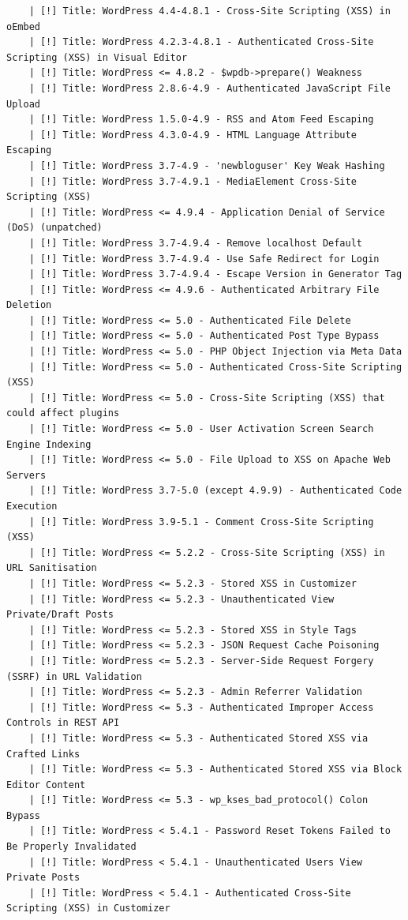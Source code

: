 \documentclass[11pt]{utalcaDoc}
\begin{document}
\begin{verbatim}
	| [!] Title: WordPress 4.4-4.8.1 - Cross-Site Scripting (XSS) in oEmbed
	| [!] Title: WordPress 4.2.3-4.8.1 - Authenticated Cross-Site Scripting (XSS) in Visual Editor
	| [!] Title: WordPress <= 4.8.2 - $wpdb->prepare() Weakness
	| [!] Title: WordPress 2.8.6-4.9 - Authenticated JavaScript File Upload
	| [!] Title: WordPress 1.5.0-4.9 - RSS and Atom Feed Escaping
	| [!] Title: WordPress 4.3.0-4.9 - HTML Language Attribute Escaping
	| [!] Title: WordPress 3.7-4.9 - 'newbloguser' Key Weak Hashing
	| [!] Title: WordPress 3.7-4.9.1 - MediaElement Cross-Site Scripting (XSS)
	| [!] Title: WordPress <= 4.9.4 - Application Denial of Service (DoS) (unpatched)
	| [!] Title: WordPress 3.7-4.9.4 - Remove localhost Default
	| [!] Title: WordPress 3.7-4.9.4 - Use Safe Redirect for Login
	| [!] Title: WordPress 3.7-4.9.4 - Escape Version in Generator Tag
	| [!] Title: WordPress <= 4.9.6 - Authenticated Arbitrary File Deletion
	| [!] Title: WordPress <= 5.0 - Authenticated File Delete
	| [!] Title: WordPress <= 5.0 - Authenticated Post Type Bypass
	| [!] Title: WordPress <= 5.0 - PHP Object Injection via Meta Data
	| [!] Title: WordPress <= 5.0 - Authenticated Cross-Site Scripting (XSS)
	| [!] Title: WordPress <= 5.0 - Cross-Site Scripting (XSS) that could affect plugins
	| [!] Title: WordPress <= 5.0 - User Activation Screen Search Engine Indexing
	| [!] Title: WordPress <= 5.0 - File Upload to XSS on Apache Web Servers
	| [!] Title: WordPress 3.7-5.0 (except 4.9.9) - Authenticated Code Execution
	| [!] Title: WordPress 3.9-5.1 - Comment Cross-Site Scripting (XSS)
	| [!] Title: WordPress <= 5.2.2 - Cross-Site Scripting (XSS) in URL Sanitisation
	| [!] Title: WordPress <= 5.2.3 - Stored XSS in Customizer
	| [!] Title: WordPress <= 5.2.3 - Unauthenticated View Private/Draft Posts
	| [!] Title: WordPress <= 5.2.3 - Stored XSS in Style Tags
	| [!] Title: WordPress <= 5.2.3 - JSON Request Cache Poisoning
	| [!] Title: WordPress <= 5.2.3 - Server-Side Request Forgery (SSRF) in URL Validation 
	| [!] Title: WordPress <= 5.2.3 - Admin Referrer Validation
	| [!] Title: WordPress <= 5.3 - Authenticated Improper Access Controls in REST API
	| [!] Title: WordPress <= 5.3 - Authenticated Stored XSS via Crafted Links
	| [!] Title: WordPress <= 5.3 - Authenticated Stored XSS via Block Editor Content
	| [!] Title: WordPress <= 5.3 - wp_kses_bad_protocol() Colon Bypass
	| [!] Title: WordPress < 5.4.1 - Password Reset Tokens Failed to Be Properly Invalidated
	| [!] Title: WordPress < 5.4.1 - Unauthenticated Users View Private Posts
	| [!] Title: WordPress < 5.4.1 - Authenticated Cross-Site Scripting (XSS) in Customizer

\end{verbatim}
\end{document}
